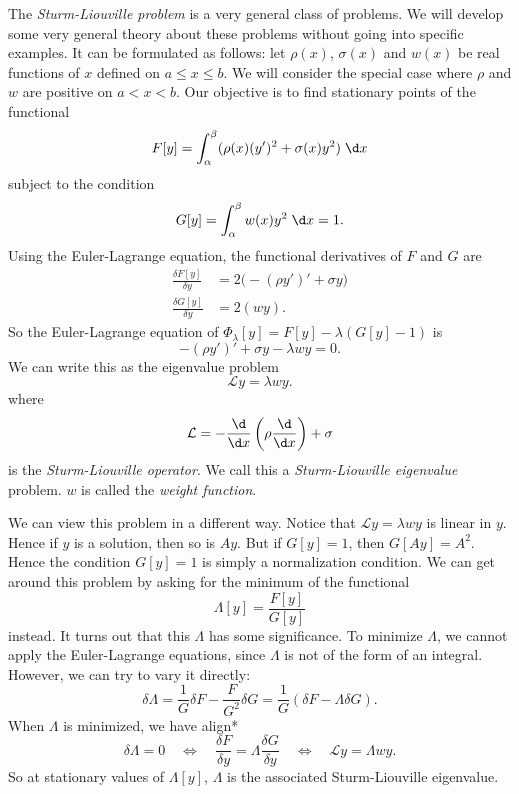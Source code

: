 \documentclass[a4paper]{article}
\begin{document}
\begin{eg}
  The \emph{Sturm-Liouville problem} is a very general class of problems. We will develop some very general theory about these problems without going into specific examples. It can be formulated as follows: let $\rho(x)$, $\sigma(x)$ and $w(x)$ be real functions of $x$ defined on $a \leq x \leq b$. We will consider the special case where $\rho$ and $w$ are positive on $a < x < b$. Our objective is to find stationary points of the functional
  \[
    F[y] = \int_\alpha^\beta (\rho(x)(y')^2 + \sigma(x)y^2)\;\d x
  \]
  subject to the condition
  \[
    G[y] = \int_\alpha^\beta w(x)y^2\;\d x = 1.
  \]
  Using the Euler-Lagrange equation, the functional derivatives of $F$ and $G$ are
  \begin{align*}
    \frac{\delta F[y]}{\delta y} &= 2\big(-(\rho y')' + \sigma y\big)\\
    \frac{\delta G[y]}{\delta y} &= 2 (wy).
  \end{align*}
  So the Euler-Lagrange equation of $\Phi_\lambda [y] = F[y] - \lambda(G[y] - 1)$ is
  \[
    -(\rho y')' + \sigma y - \lambda wy = 0.
  \]
  We can write this as the eigenvalue problem
  \[
    \mathcal{L}y = \lambda wy.
  \]
  where
  \[
    \mathcal{L} = -\frac{\d}{\d x}\left(\rho\frac{\d}{\d x}\right) + \sigma
  \]
  is the \emph{Sturm-Liouville operator}. We call this a \emph{Sturm-Liouville eigenvalue} problem. $w$ is called the \emph{weight function}.

  We can view this problem in a different way. Notice that $\mathcal{L} y = \lambda wy$ is linear in $y$. Hence if $y$ is a solution, then so is $Ay$. But if $G[y] = 1$, then $G[Ay] = A^2$. Hence the condition $G[y] = 1$ is simply a normalization condition. We can get around this problem by asking for the minimum of the functional
  \[
    \Lambda [y] = \frac{F[y]}{G[y]}
  \]
  instead. It turns out that this $\Lambda$ has some significance. To minimize $\Lambda$, we cannot apply the Euler-Lagrange equations, since $\Lambda$ is not of the form of an integral. However, we can try to vary it directly:
  \[
    \delta\Lambda = \frac{1}{G}\delta F - \frac{F}{G^2} \delta G = \frac{1}{G}(\delta F - \Lambda \delta G).
  \]
  When $\Lambda$ is minimized, we have
  align*
  \[
    \delta \Lambda = 0 \quad\Leftrightarrow\quad \frac{\delta F}{\delta y} = \Lambda \frac{\delta G}{\delta y}\quad \Leftrightarrow\quad \mathcal{L} y = \Lambda wy.
  \]
  So at stationary values of $\Lambda[y]$, $\Lambda$ is the associated Sturm-Liouville eigenvalue.
\end{eg}
\end{document}
